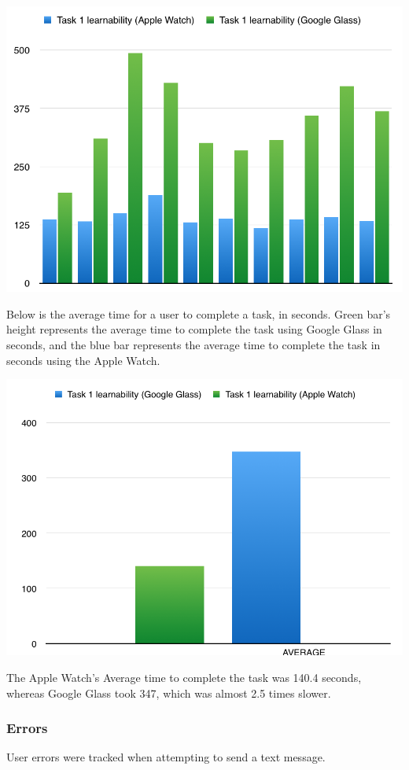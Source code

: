 \documentclass[paper=a4, fontsize=11pt]{scrartcl}	%
\numberwithin{equation}{section}															%
\numberwithin{figure}{section}																%
\numberwithin{table}{section}																%
\begin{document}
\includegraphics[scale=0.7]{charttask1}

Below is the average time for a user to complete a task, in seconds. Green bar's height represents the average time to complete the task using Google Glass in seconds, and the blue bar represents the average time to complete the task in seconds using the Apple Watch.

\includegraphics[scale=0.8]{task1average}

The Apple Watch's Average time to complete the task was 140.4 seconds, whereas Google Glass took 347, which was almost 2.5 times slower.


\subsubsection{Errors}
User errors were tracked when attempting to send a text message.
\end{document}
